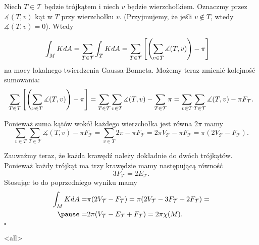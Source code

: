\begin{frame}

Niech $T\in \mathcal{T}$ będzie trójkątem i niech $v$ będzie wierzchołkiem. Oznaczmy przez $\measuredangle(T,v)$ kąt w $T$ przy wierzchołku $v$. (Przyjmujemy, że jeśli $v\notin T$, wtedy $\measuredangle(T,v)=0$). \pause Wtedy 
\end{frame}

\begin{align*}
\int_M K dA&=\sum_{T\in \mathcal{T}}\int_{T}KdA=\sum_{T\in \mathcal{T}}\left[ 
\left(\sum_{v\in T}\measuredangle(T,v)\right)-\pi\right]
\end{align*}
na mocy lokalnego twierdzenia Gaussa-Bonneta. Możemy teraz zmienić kolejność 
sumowania:
\begin{align*}
\sum_{T\in \mathcal{T}}\left[ \left(\sum_{v\in 
T}\measuredangle(T,v)\right)-\pi\right] = \sum_{T\in \mathcal{T}}\sum_{v\in 
T}\measuredangle(T,v)-\sum_{T\in \mathcal{T}}\pi=\sum_{v\in T}\sum_{T\in 
\mathcal{T}}\measuredangle(T,v)-\pi F_{\mathcal{T}}.
\end{align*}

Ponieważ suma kątów wokół każdego wierzchołka jest równa 
$2\pi$ mamy
\[
\sum_{v\in T}\sum_{T\in \mathcal{T}}\measuredangle(T,v)-\pi 
F_{\mathcal{T}}=\sum_{v\in T}2\pi -\pi F_\mathcal{T}=2\pi V_\mathcal{T}-\pi 
F_\mathcal{T}=\pi (2V_\mathcal{T}-F_\mathcal{T}).\]
\begin{frame}
\pause Zauważmy teraz, że każda krawędź należy dokładnie do dwóch trójkątów. Ponieważ każdy trójkąt ma trzy krawędzie mamy następującą równość
\[3F_\mathcal{T}=2E_\mathcal{T}.\]\pause
Stosując to do poprzedniego wyniku mamy
\begin{align*}
\int_M K dA=&\pi(2V_\mathcal{T}-F_\mathcal{T})=\pi( 2V_\mathcal{T}-3F_\mathcal{T}+2F_\mathcal{T})=\\\pause
=&2\pi( V_\mathcal{T}-E_\mathcal{T}+F_\mathcal{T})=2\pi \chi(M).
\end{align*}
\vspace*{-0.2in}\hfill $\square$
\end{frame}
\mode<all> 
